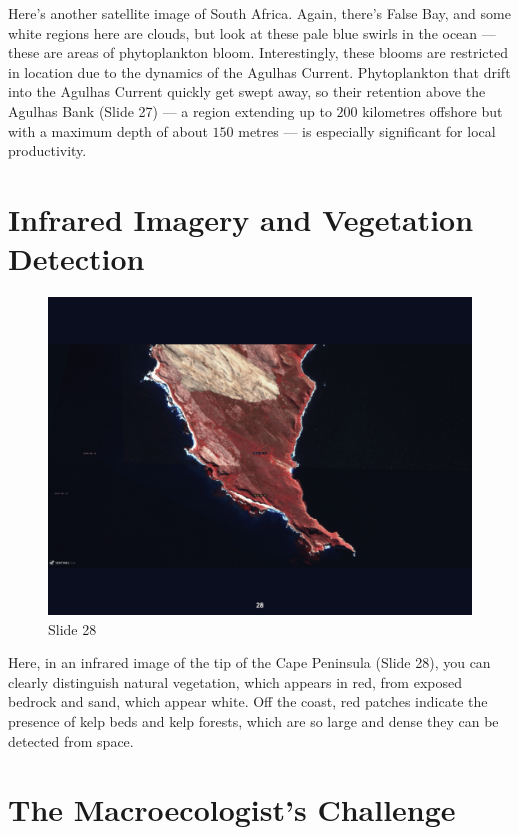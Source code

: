 \documentclass[
  11pt,
]{book}
\begin{document}
Here's another satellite image of South Africa. Again, there's False
Bay, and some white regions here are clouds, but look at these pale blue
swirls in the ocean --- these are areas of phytoplankton bloom.
Interestingly, these blooms are restricted in location due to the
dynamics of the Agulhas Current. Phytoplankton that drift into the
Agulhas Current quickly get swept away, so their retention above the
Agulhas Bank (Slide 27) --- a region extending up to \(200\) kilometres
offshore but with a maximum depth of about \(150\) metres --- is
especially significant for local productivity.

\section{Infrared Imagery and Vegetation
Detection}\label{infrared-imagery-and-vegetation-detection}

\begin{figure}[ht]
\centering
\includegraphics[width=0.8\linewidth]{../images/BDC334/BDC334-028.jpeg}
\caption*{Slide 28}
\end{figure}

Here, in an infrared image of the tip of the Cape Peninsula (Slide 28),
you can clearly distinguish natural vegetation, which appears in red,
from exposed bedrock and sand, which appear white. Off the coast, red
patches indicate the presence of kelp beds and kelp forests, which are
so large and dense they can be detected from space.

\section{The Macroecologist's
Challenge}\label{the-macroecologists-challenge}
\end{document}
